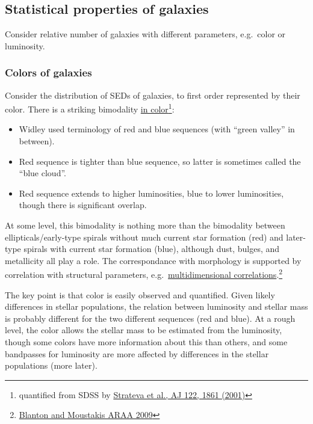 \documentclass{article}
\begin{document}
\subsection{Statistical properties of galaxies}
Consider relative number of galaxies with different parameters,
e.g.\ color or luminosity.

\subsubsection{Colors of galaxies}
Consider the distribution of SEDs of galaxies, to first order represented by
their color. There is a striking bimodality
\href{http://astronomy.nmsu.edu/holtz/a555/images/strateva.htm}
{in color}\footnote{quantified from SDSS by
\href{http://adsabs.harvard.edu/cgi-bin/bib_query?2001AJ....122.1861S}
{Strateva et al., AJ 122, 1861 (2001)}}:
\begin{itemize}
    \item Widley used terminology of red and blue sequences
        (with ``green valley'' in between).
    \item Red sequence is tighter than blue sequence, so latter is
        sometimes called the ``blue cloud''.
    \item Red sequence extends to higher luminosities, blue to lower
        luminosities, though there is significant overlap.
\end{itemize}
At some level, this bimodality is nothing more than the bimodality between
ellipticals/early-type spirals without much current star formation (red)
and later-type spirals with current star formation (blue), although
dust, bulges, and metallicity all play a role.
The correspondance with morphology is supported
by correlation with structural parameters, e.g.\
\href{http://astronomy.nmsu.edu/holtz/a555/resources/blanton_araa_correlations.htm}
{multidimensional correlations}.\footnote{
    \href{http://adsabs.harvard.edu/abs/2009ARA\%26A..47..159B}
    {Blanton and Moustakis ARAA 2009}
}

The key point is that color is easily observed and quantified. Given likely
differences in stellar populations, the relation between luminosity and stellar
mass is probably different for the two different sequences (red and blue). At a
rough level, the color allows the stellar mass to be estimated from the
luminosity, though some colors have more information about this than others,
and some bandpasses for luminosity are more affected by differences in the
stellar populations (more later).
\end{document}
